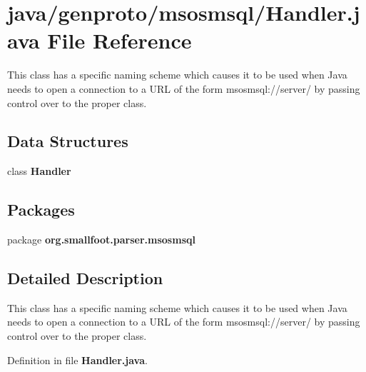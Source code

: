 \section{java/genproto/msosmsql/\+Handler.java File Reference}
\label{msosmsql_2Handler_8java}


This class has a specific naming scheme which causes it to be used when Java needs to open a connection to a U\+R\+L of the form msosmsql\+://server/ by passing control over to the proper class.  


\subsection*{Data Structures}
\begin{DoxyCompactItemize}
\item 
class {\bf Handler}
\end{DoxyCompactItemize}
\subsection*{Packages}
\begin{DoxyCompactItemize}
\item 
package {\bf org.\+smallfoot.\+parser.\+msosmsql}
\end{DoxyCompactItemize}


\subsection{Detailed Description}
This class has a specific naming scheme which causes it to be used when Java needs to open a connection to a U\+R\+L of the form msosmsql\+://server/ by passing control over to the proper class. 



Definition in file {\bf Handler.\+java}.

